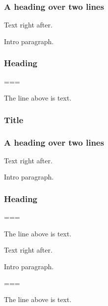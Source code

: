 \begin{frame}[t]
\frametitle{A heading over
two lines}

\end{frame}

\begin{frame}[t]
Text right after.

Intro paragraph.

\end{frame}

\begin{frame}[t]
\frametitle{Heading}

\end{frame}

\begin{frame}[t]

===

The line above is text.
\end{frame}

\begin{frame}[t]
\frametitle{Title}

\end{frame}

\begin{frame}[t]
\frametitle{A heading over
two lines}
Text right after.

Intro paragraph.

\end{frame}

\begin{frame}[t]
\frametitle{Heading}

===

The line above is text.
\end{frame}

\begin{frame}[t]
Text right after.

Intro paragraph.


===

The line above is text.
\end{frame}

